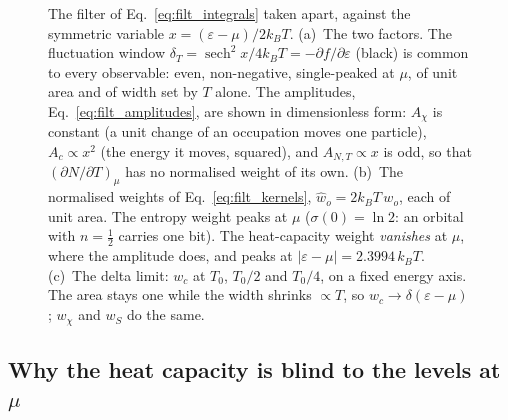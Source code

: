 \documentclass[10pt,a4paper]{article}
\theoremstyle{plain}
\theoremstyle{remark}
\begin{document}
\begin{figure}[htbp]
\caption{The filter of Eq.~\eqref{eq:filt_integrals} taken apart, against the
symmetric variable $x=(\varepsilon-\mu)/2k_BT$.
(a)~The two factors. The fluctuation window
$ \delta_T = \operatorname{sech}^{2}x/4k_BT = -\partial f/\partial\varepsilon $
(black) is common to every observable: even, non-negative, single-peaked at $\mu$,
of unit area and of width set by $T$ alone. The amplitudes,
Eq.~\eqref{eq:filt_amplitudes}, are shown in dimensionless form: $ A_\chi $ is
constant (a unit change of an occupation moves one particle), $ A_c \propto x^{2} $
(the energy it moves, squared), and $ A_{N,T} \propto x $ is odd, so that
$ (\partial N/\partial T)_\mu $ has no normalised weight of its own.
(b)~The normalised weights of Eq.~\eqref{eq:filt_kernels}, $ \hat w_o = 2k_BT\,w_o $,
each of unit area. The entropy weight peaks at $\mu$ ($ \sigma(0) = \ln2 $: an
orbital with $ n = \tfrac12 $ carries one bit). The heat-capacity weight \emph{vanishes} at
$\mu$, where the amplitude does, and peaks at $|\varepsilon-\mu|=2.3994\,k_BT$.
(c)~The delta limit: $ w_c $ at $ T_0 $, $ T_0/2 $ and $ T_0/4 $, on a fixed energy
axis. The area stays one while the width shrinks $ \propto T $, so
$ w_c \to \delta(\varepsilon - \mu) $; $ w_\chi $ and $ w_S $ do the same.}
\label{fig:filt_kernels}
\end{figure}

\subsection{Why the heat capacity is blind to the levels at \texorpdfstring{$\mu$}{mu}}
\label{sec:filt_blind}
\end{document}
